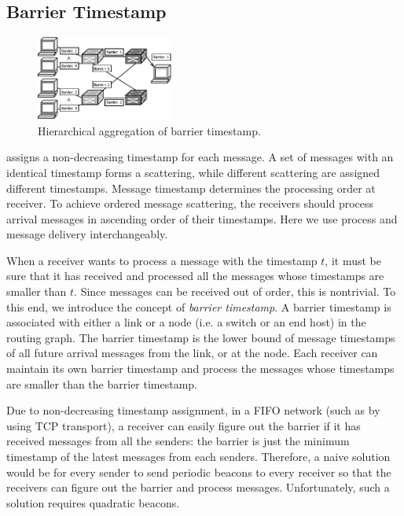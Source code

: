 \subsection{Barrier Timestamp}
\label{sec:ideal}

\begin{figure}[t]
\centering
\includegraphics[width=0.4\textwidth]{images/hierarchical_merge.pdf}
\caption{Hierarchical aggregation of barrier timestamp.} %
\label{fig:hierarchical_merge}
\vspace{-0.9em}
\end{figure}

\sys assigns a non-decreasing timestamp for each message. A set of messages with an identical timestamp forms a scattering, while different scattering are assigned different timestamps. %
Message timestamp determines the processing order at receiver. To achieve ordered message scattering, the receivers should process arrival messages in ascending order of their timestamps. Here we use process and message delivery interchangeably. 

 When a receiver wants to process a message with the timestamp $t$, it must be sure that it has received and processed all the messages whose timestamps are smaller than $t$. Since messages can be received out of order, this is nontrivial. To this end, we introduce the concept of \emph{barrier timestamp}. A barrier timestamp is associated with either a link or a node (i.e. a switch or an end host) in the routing graph. The barrier timestamp is the lower bound of message timestamps of all future arrival messages from the link, or at the node. Each receiver can maintain its own barrier timestamp and process the messages whose timestamps are smaller than the barrier timestamp.

Due to non-decreasing timestamp assignment, in a FIFO network (such as by using TCP transport), a receiver can easily figure out the barrier if it has received messages from all the senders: the barrier is just the minimum timestamp of the latest messages from each senders. Therefore, a naive solution would be for every sender to send periodic beacons to every receiver so that the receivers can figure out the barrier and process messages. Unfortunately, such a solution requires quadratic beacons.

